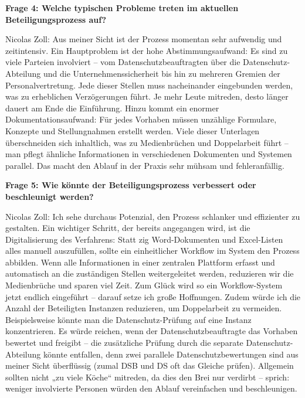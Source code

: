 \documentclass[
    12pt, 
    a4paper,
    ]{scrartcl} %
\begin{document}
\textbf{Frage 4: Welche typischen Probleme treten im aktuellen Beteiligungsprozess auf?}

Nicolas Zoll: Aus meiner Sicht ist der Prozess momentan sehr aufwendig und zeitintensiv. Ein Hauptproblem ist der hohe Abstimmungsaufwand: Es sind zu viele Parteien involviert – vom Datenschutzbeauftragten über die Datenschutz-Abteilung und die Unternehmenssicherheit bis hin zu mehreren Gremien der Personalvertretung. Jede dieser Stellen muss nacheinander eingebunden werden, was zu erheblichen Verzögerungen führt. Je mehr Leute mitreden, desto länger dauert am Ende die Einführung. Hinzu kommt ein enormer Dokumentationsaufwand: Für jedes Vorhaben müssen unzählige Formulare, Konzepte und Stellungnahmen erstellt werden. Viele dieser Unterlagen überschneiden sich inhaltlich, was zu Medienbrüchen und Doppelarbeit führt – man pflegt ähnliche Informationen in verschiedenen Dokumenten und Systemen parallel. Das macht den Ablauf in der Praxis sehr mühsam und fehleranfällig.

\textbf{Frage 5: Wie könnte der Beteiligungsprozess verbessert oder beschleunigt werden?}

Nicolas Zoll: Ich sehe durchaus Potenzial, den Prozess schlanker und effizienter zu gestalten. Ein wichtiger Schritt, der bereits angegangen wird, ist die Digitalisierung des Verfahrens: Statt zig Word-Dokumenten und Excel-Listen alles manuell auszufüllen, sollte ein einheitlicher Workflow im System den Prozess abbilden. Wenn alle Informationen in einer zentralen Plattform erfasst und automatisch an die zuständigen Stellen weitergeleitet werden, reduzieren wir die Medienbrüche und sparen viel Zeit. Zum Glück wird so ein Workflow-System jetzt endlich eingeführt – darauf setze ich große Hoffnungen. Zudem würde ich die Anzahl der Beteiligten Instanzen reduzieren, um Doppelarbeit zu vermeiden. Beispielsweise könnte man die Datenschutz-Prüfung auf eine Instanz konzentrieren. Es würde reichen, wenn der Datenschutzbeauftragte das Vorhaben bewertet und freigibt – die zusätzliche Prüfung durch die separate Datenschutz-Abteilung könnte entfallen, denn zwei parallele Datenschutzbewertungen sind aus meiner Sicht überflüssig (zumal DSB und DS oft das Gleiche prüfen). Allgemein sollten nicht „zu viele Köche“ mitreden, da dies den Brei nur verdirbt – sprich: weniger involvierte Personen würden den Ablauf vereinfachen und beschleunigen.
\end{document}
